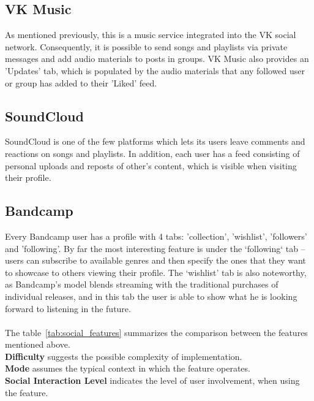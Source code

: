 \subsection{VK Music}
As mentioned previously, this is a music service integrated into the VK social network.
Consequently, it is possible to send songs and playlists via private messages and add audio materials to
posts in groups. VK Music also provides an 'Updates' tab, which is populated by the audio materials that
any followed user or group has added to their 'Liked' feed.

\subsection{SoundCloud}
SoundCloud is one of the few platforms which lets its users leave comments
and reactions on songs and playlists\cite{sc_comments,sc_reactions}.
In addition, each user has a feed consisting of personal uploads and
reposts of other's content\cite{sc_reposts}, which is visible when visiting their profile.

\subsection{Bandcamp}
Every Bandcamp user has a profile with 4 tabs: 'collection', 'wishlist', 'followers' and 'following'.
By far the most interesting feature is under the `following` tab -- users can subscribe to available genres and then
specify the ones that they want to showcase to others viewing their profile.
The ‘wishlist’ tab is also noteworthy,
as Bandcamp’s model blends streaming with the traditional purchases of individual releases, and
in this tab the user is able to show what he is looking forward to listening in the future.
\\\\
The table~\ref{tab:social_features} summarizes the comparison between the features mentioned above.\\
\textbf{Difficulty} suggests the possible complexity of implementation.\\
\textbf{Mode} assumes the typical context in which the feature operates.\\
\textbf{Social Interaction Level} indicates the level of user involvement, when using the feature.\\

